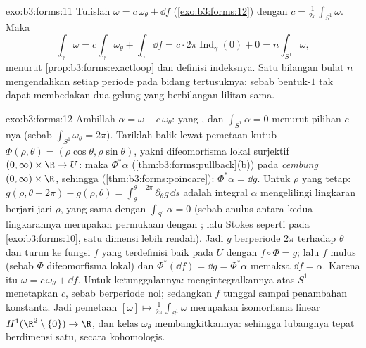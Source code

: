 \begin{solution}{exo:b3:forms:11}
Tulislah $\omega = c\,\omega_\theta + \dd f$
(\cref{exo:b3:forms:12}) dengan $c =
\frac1{2\pi}\int_{S^1}\omega$. Maka
\[
\int_\gamma\omega = c\int_\gamma\omega_\theta +
\int_\gamma\dd f
= c\cdot2\pi\operatorname{Ind}_\gamma(0) + 0
= n\int_{S^1}\omega,
\]
menurut \cref{prop:b3:forms:exactloop} dan definisi
indeksnya. Satu bilangan bulat $n$ mengendalikan setiap periode pada
bidang tertusuknya: sebab bentuk-$1$  tak dapat membedakan dua
gelung yang berbilangan lilitan sama.
\end{solution}

\begin{solution}{exo:b3:forms:12}
Ambillah $\alpha = \omega - c\,\omega_\theta$: yang , dan
$\int_{S^1}\alpha = 0$ menurut pilihan $c$-nya
(sebab $\int_{S^1}\omega_\theta = 2\pi$). Tariklah balik lewat pemetaan
kutub $\Phi(\rho, \theta) = (\rho\cos\theta, \rho\sin\theta)$,
yakni difeomorfisma lokal surjektif $(0, \infty)\times\R \to
U$: maka $\Phi^*\alpha$ 
(\cref{thm:b3:forms:pullback}(b)) pada  \emph{cembung}
$(0,\infty)\times\R$, sehingga 
(\cref{thm:b3:forms:poincare}): $\Phi^*\alpha = \dd g$.
Untuk $\rho$ yang tetap: $g(\rho, \theta + 2\pi) - g(\rho, \theta)
= \int_\theta^{\theta + 2\pi}\partial_\theta g\,\dd s$ adalah
integral $\alpha$ mengelilingi lingkaran berjari-jari
$\rho$, yang sama dengan $\int_{S^1}\alpha = 0$ (sebab anulus
antara kedua lingkarannya merupakan permukaan  dengan ;
lalu Stokes seperti pada \cref{exo:b3:forms:10}, satu dimensi lebih rendah).
Jadi $g$ berperiode $2\pi$ terhadap $\theta$ dan turun ke
fungsi $f$ yang terdefinisi baik pada $U$ dengan $f\circ\Phi = g$;
lalu $f$ mulus (sebab $\Phi$ difeomorfisma lokal) dan
$\Phi^*(\dd f) = \dd g = \Phi^*\alpha$ memaksa $\dd f =
\alpha$. Karena itu $\omega = c\,\omega_\theta + \dd f$.
Untuk ketunggalannya: mengintegralkannya atas $S^1$ menetapkan $c$, sebab  berperiode nol; sedangkan $f$ tunggal sampai penambahan
konstanta. Jadi pemetaan $[\omega] \mapsto
\frac1{2\pi}\int_{S^1}\omega$ merupakan isomorfisma
linear $H^1(\R^2\setminus\{0\}) \to \R$, dan kelas
$\omega_\theta$ membangkitkannya: sehingga lubangnya tepat
berdimensi satu, secara kohomologis.
\end{solution}

